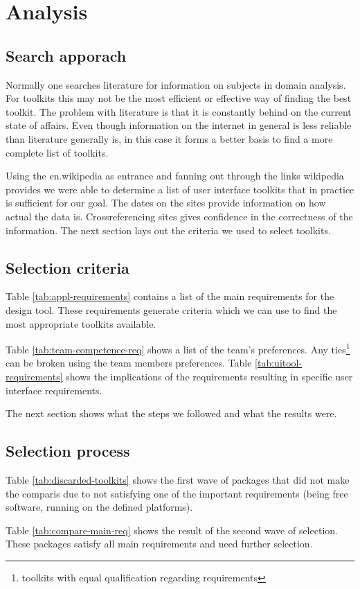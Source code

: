\section{Analysis}

\subsection{Search apporach}

Normally one searches literature for information on subjects in domain
analysis.  For toolkits this may not be the most efficient or effective way of
finding the best toolkit. The problem with literature is that it is constantly
behind on the current state of affairs. Even though information on the internet
in general is less reliable than literature generally is, in this case it forms
a better basis to find a more complete list of toolkits. 

Using the en.wikipedia as entrance and fanning out through the links wikipedia
provides we were able to determine a list of user interface toolkits that in
practice is sufficient for our goal. The dates on the sites provide information
on how actual the data is. Crossreferencing sites gives confidence in the
correctness of the information. The next section lays out the criteria we used
to select toolkits.

\subsection{Selection criteria}

Table \ref{tab:appl-requirements} contains a list of the main requirements for
the design tool. These requirements generate criteria which we can use to find
the most appropriate toolkits available.

Table \ref{tab:team-competence-req} shows a list of the team's preferences.
Any ties\footnote{toolkits with equal qualification regarding requirements} can
be broken using the team members preferences. Table
\ref{tab:uitool-requirements} shows the implications of the requirements
resulting in specific user interface requirements.

The next section shows what the steps we followed and what the results were.

\subsection{Selection process}

Table \ref{tab:discarded-toolkits} shows the first wave of packages that did
not make the comparis due to not satisfying one of the important requirements
(being free software, running on the defined platforms).

Table \ref{tab:compare-main-req} shows the result of the second wave of
selection. These packages satisfy all main requirements and need further
selection. 


